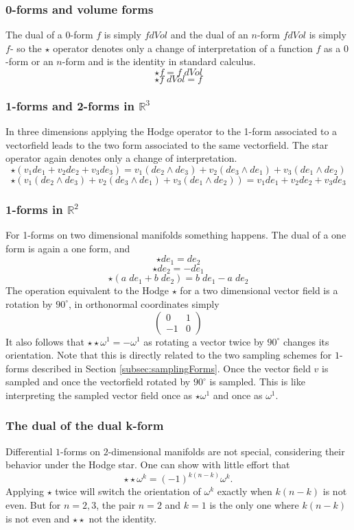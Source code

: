 \subsubsection{0-forms and volume forms}
The dual of a 0-form $f$ is simply $f dVol$ and the dual of an $n$-form $f dVol$ is simply $f$- so the $\star$ operator denotes only a change of interpretation of a function $f$ as a $0$-form or an $n$-form and is the identity in standard calculus.
\[\star f = f\; dVol\]
\[\star f\;dVol = f\]
\subsubsection{1-forms and 2-forms in $\mathbb R^3$}
In three dimensions applying the Hodge operator to the 1-form associated to a vectorfield leads to the two form associated to the same vectorfield. The star operator again denotes only a change of interpretation.
\[\star(v_1de_1 + v_2 de_2 + v_3 de_3) = v_1(de_2\wedge de_3) + v_2 (de_3\wedge de_1) + v_3(de_1\wedge de_2)\]
\[\star(v_1(de_2\wedge de_3) + v_2 (de_3\wedge de_1) + v_3(de_1\wedge de_2)) = v_1de_1 + v_2 de_2 + v_3 de_3\]

\subsubsection{1-forms in $\mathbb R^2$}
For 1-forms on two dimensional manifolds something happens. The dual of a one form is again a one form, and
\[\star de_1 = de_2\]
\[\star de_2 = -de_1\]
\[\star(a\;de_1 + b\;de_2) = b\;de_1 -a\;de_2\]
The operation equivalent to the Hodge $\star$ for a two dimensional vector field is a rotation by $90^\circ$, in orthonormal coordinates simply
\[\begin{pmatrix}
0 & 1 \\
-1 & 0
\end{pmatrix}\]
It also follows that $\star \star \omega^1 = -\omega^1$ as rotating a vector twice by $90^\circ$ changes its orientation. Note that this is directly related to the two sampling schemes for $1$-forms described in Section \ref{subsec:samplingForms}. Once the vector field $v$ is sampled and once the vectorfield rotated by $90^\circ$ is sampled. This is like interpreting the sampled vector field once as $\star \omega^1$ and once as $\omega^1$.
\subsubsection{The dual of the dual k-form}
Differential $1$-forms on $2$-dimensional manifolds are not special, considering their behavior under the Hodge star. One can  show with little effort that
\[\star\star \omega ^k = (-1)^{k(n-k)}\omega^k.\]
Applying $\star$ twice will switch the orientation of $\omega^k$ exactly when $k(n-k)$ is not even. But for $n= 2,3$, the pair $n=2$ and $k=1$ is the only one where $k(n-k)$ is not even and $\star\star$ not the identity.


